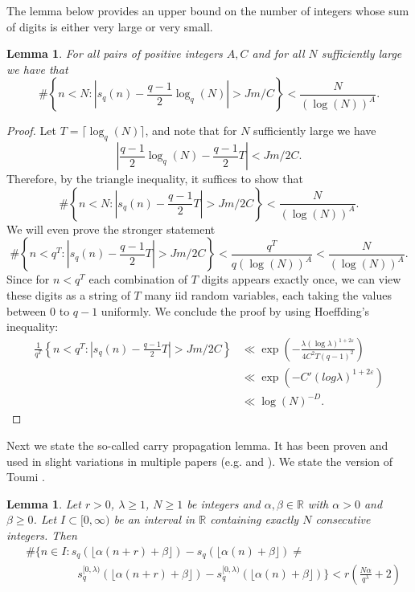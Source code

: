 \documentclass[12pt]{amsart}
\renewcommand{\geq}{\geqslant}
\newtheorem{lemma}[theorem]{Lemma}
\theoremstyle{definition}
\numberwithin{equation}{section}
\newcommand\RR{\mathbb{R}}
\numberwithin{equation}{section}
\begin{document}
The lemma below provides an upper bound on the number of integers whose sum of digits is either very large or very small.
\begin{lemma}\label{lem_bound_on_exception}
	For all pairs of positive integers $A, C$ and for all $N$ sufficiently large we have that
	\[
		\#\left\{n<N:\left|s_q(n)-\frac{q-1}{2}\log_q(N)\right|>Jm/C\right\} < \frac{N}{(\log(N))^A}.
	\]
\end{lemma}
\begin{proof}
	Let $T=\lceil \log_q(N) \rceil$, and note that for $N$ sufficiently large we have
	\[
		\left|\frac{q-1}{2}\log_q(N)-\frac{q-1}{2}T\right|<Jm/2C.
	\]
	Therefore, by the triangle inequality, it suffices to show that
	\[
		\#\left\{n<N:\left|s_q(n)-\frac{q-1}{2}T\right|>Jm/2C\right\} < \frac{N}{(\log(N))^A}.
	\]
	We will even prove the stronger statement
	\[
		\#\left\{n<q^T:\left|s_q(n)-\frac{q-1}{2}T\right|>Jm/2C\right\} < \frac{q^T}{q(\log(N))^A} < \frac{N}{(\log(N))^A}.
	\]
	Since for $n<q^T$ each combination of $T$ digits appears exactly once, we can view these digits as a string of $T$ many iid random variables, each taking the values between $0$ to $q-1$ uniformly. We conclude the proof by using Hoeffding's inequality:
	\begin{align*}
		\frac 1{q^T}\left\{n < q^T:\left|s_q(n)-\frac{q-1}{2}T\right|>Jm/2C\right\}
		&\ll \exp\left(-\frac{\lambda(\log\lambda)^{1+2\varepsilon}}{4C^2T(q-1)^2}\right)\\
		&\ll \exp(-C'(log\lambda)^{1+2\varepsilon})\\
		&\ll \log(N)^{-D}.
	\end{align*}
\end{proof}

Next we state the so-called carry propagation lemma. It has been proven and used in slight variations in multiple papers (e.g. \cite{Spiegelhofer2018} and \cite{MauduitRivat2010}). We state the version of Toumi \cite[Lemma 3.3]{Toumi2025}.
\begin{lemma}\label{lem_carries}
	Let $r>0$, $\lambda\geq1$, $N\geq 1$ be integers and $\alpha,\beta\in \RR$ with $\alpha>0$ and $\beta\geq 0$. Let $I\subset[0,\infty)$ be an interval in $\RR$ containing exactly $N$ consecutive integers. Then
	\begin{align*}
		&\#\big\{n\in I: s_q(\lfloor\alpha(n+r)+\beta\rfloor)-s_q(\lfloor\alpha(n)+\beta\rfloor)
		\neq\\
		&\hspace{55pt} s_q^{[0,\lambda)}(\lfloor\alpha(n+r)+\beta\rfloor)-
		s_q^{[0,\lambda)}(\lfloor\alpha(n)+\beta\rfloor)\big\}
		<r\left(\frac{N\alpha}{q^\lambda}+2\right)
	\end{align*}
\end{lemma}
\end{document}
